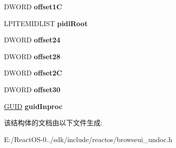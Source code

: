 \begin{DoxyCompactItemize}
D\+W\+O\+RD {\bfseries offset1C}
\item 
\mbox{\label{struct_explorer_command_line_parse_results_abbd66bbcc52fb5d1d602abf34b8db46d}} 
L\+P\+I\+T\+E\+M\+I\+D\+L\+I\+ST {\bfseries pidl\+Root}
\item 
\mbox{\label{struct_explorer_command_line_parse_results_acdf8b88c587d79d350b98322cfde87c1}} 
D\+W\+O\+RD {\bfseries offset24}
\item 
\mbox{\label{struct_explorer_command_line_parse_results_a406fcd5e68f188247ab0c70ff6f62b20}} 
D\+W\+O\+RD {\bfseries offset28}
\item 
\mbox{\label{struct_explorer_command_line_parse_results_a2f12bdf8ec238d1e783fe7f083803d42}} 
D\+W\+O\+RD {\bfseries offset2C}
\item 
\mbox{\label{struct_explorer_command_line_parse_results_ab0cb8f0a47af0fe9077314535a477012}} 
D\+W\+O\+RD {\bfseries offset30}
\item 
\mbox{\label{struct_explorer_command_line_parse_results_a2e120b4b3c197795211e212d8302eb87}} 
\hyperlink{interface_g_u_i_d}{G\+U\+ID} {\bfseries guid\+Inproc}
\end{DoxyCompactItemize}


该结构体的文档由以下文件生成\+:\begin{DoxyCompactItemize}
\item 
E\+:/\+React\+O\+S-\/0../sdk/include/reactos/browseui\+\_\+undoc.\+h\end{DoxyCompactItemize}
